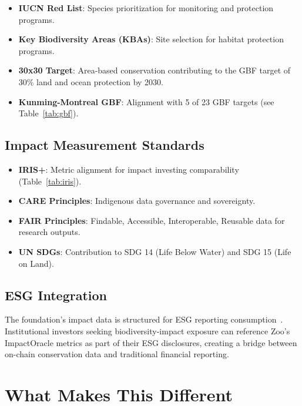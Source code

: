 \documentclass[11pt,letterpaper]{article}
\begin{document}
\begin{itemize}
    \item \textbf{IUCN Red List}: Species prioritization for monitoring and protection programs.
    \item \textbf{Key Biodiversity Areas (KBAs)}: Site selection for habitat protection programs.
    \item \textbf{30x30 Target}: Area-based conservation contributing to the GBF target of 30\% land and ocean protection by 2030.
    \item \textbf{Kunming-Montreal GBF}: Alignment with 5 of 23 GBF targets (see Table~\ref{tab:gbf}).
\end{itemize}

\subsection{Impact Measurement Standards}

\begin{itemize}
    \item \textbf{IRIS+}: Metric alignment for impact investing comparability (Table~\ref{tab:iris}).
    \item \textbf{CARE Principles}: Indigenous data governance and sovereignty.
    \item \textbf{FAIR Principles}: Findable, Accessible, Interoperable, Reusable data for research outputs.
    \item \textbf{UN SDGs}: Contribution to SDG 14 (Life Below Water) and SDG 15 (Life on Land).
\end{itemize}

\subsection{ESG Integration}

The foundation's impact data is structured for ESG reporting consumption~\cite{esg2022}. Institutional investors seeking biodiversity-impact exposure can reference Zoo's ImpactOracle metrics as part of their ESG disclosures, creating a bridge between on-chain conservation data and traditional financial reporting.

\section{What Makes This Different}
\end{document}
